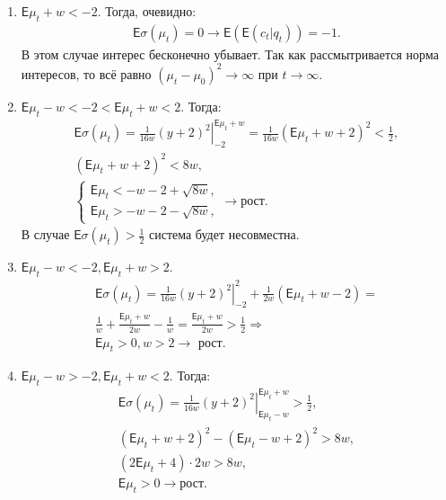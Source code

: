 \documentclass[12pt, twoside]{article}
\begin{document}
\begin{enumerate}
  \item $\mathsf{E} \mu_t + w < -2$. Тогда, очевидно:
    \begin{gather*}
      \mathsf{E}\sigma(\mu_t) = 0 \to \mathsf{E}(\mathsf{E}(c_t|q_t)) = -1.
    \end{gather*}
    В этом случае интерес бесконечно убывает. 
    Так как рассмытривается норма интересов, то всё равно $(\mu_t -\mu_0)^2 \to \infty$ при $t\to\infty$. 

  \item $\mathsf{E}\mu_t - w < -2 < \mathsf{E}\mu_t + w < 2$. Тогда:
    \begin{gather*}
      \mathsf{E}\sigma(\mu_t) = \left. \frac{1}{16w} (y+2)^2 \right|_{-2}^{\mathsf{E}\mu_t + w} = 
        \frac{1}{16w} (\mathsf{E}\mu_t + w + 2)^2 < \frac{1}{2}, \\
        (\mathsf{E}\mu_t + w + 2)^2 < 8w, \\
    \begin{cases}
      \mathsf{E}\mu_t < -w - 2 + \sqrt{8w}, \\
      \mathsf{E}\mu_t > -w - 2 - \sqrt{8w}, 
    \end{cases} \to \text{рост}.
    \end{gather*}
    В случае $\mathsf{E}\sigma(\mu_t) > \frac{1}{2}$ система будет несовместна. 

  \item $\mathsf{E}\mu_t - w < -2, \mathsf{E}\mu_t + w > 2$. 
    \begin{gather*}
      \mathsf{E}\sigma(\mu_t) = \left. \frac{1}{16 w} (y+2)^2 \right|_{-2}^{2} + \frac{1}{2 w}(\mathsf{E}\mu_t + w -2) = \\
        \frac{1}{w} + \frac{\mathsf{E}\mu_t+w}{2w} - \frac{1}{w} = \frac{\mathsf{E}\mu_t + w}{2 w} > \frac{1}{2} \Rightarrow \\
        \mathsf{E}\mu_t > 0, w > 2 \to \text{ рост}.
    \end{gather*}
  
  \item $\mathsf{E}\mu_t - w > -2, \mathsf{E}\mu_t + w < 2$. Тогда:
    \begin{gather*}
      \mathsf{E}\sigma(\mu_t) = \left. \frac{1}{16 w} (y+2)^2 \right|_{\mathsf{E}\mu_t - w}^{\mathsf{E}\mu_t + w} > \frac{1}{2},\\
        (\mathsf{E}\mu_t + w + 2)^2 - (\mathsf{E}\mu_t - w + 2)^2 > 8w,\\
        (2 \mathsf{E}\mu_t + 4) \cdot 2w > 8w,\\
        \mathsf{E} \mu_t  > 0 \to \text{рост}. 
    \end{gather*}
  

\end{enumerate}
\end{document}
